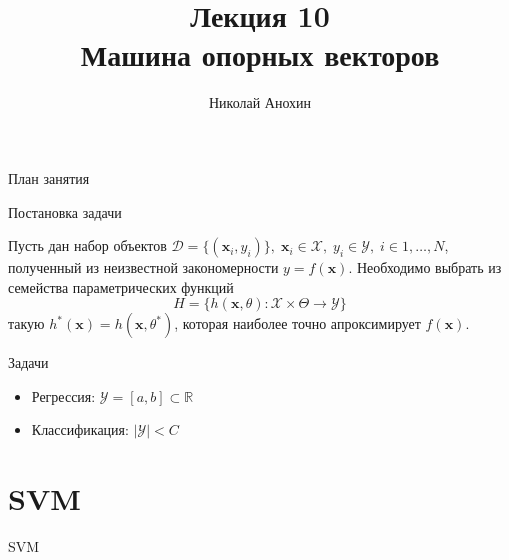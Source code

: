 \documentclass[10pt]{beamer}
\author{Николай Анохин}
\title{\newline \newline \newline Лекция 10 \\ Машина опорных векторов}
\let\otp\titlepage
\renewcommand{\titlepage}{\otp\addtocounter{framenumber}{-1}}
\begin{document}
\begin{frame}[plain]
\titlepage
\end{frame}

\begin{frame}{План занятия}
\tableofcontents
\end{frame}

\begin{frame}{Постановка задачи}

Пусть дан набор объектов $\mathcal{D} = \{(\mathbf{x}_i, y_i)\},
\; \mathbf{x}_i \in \mathcal{X},
\; y_i \in \mathcal{Y},
\; i \in 1, \ldots, N$, полученный из неизвестной закономерности $y = f(\mathbf{x})$. Необходимо выбрать из семейства параметрических функций
\[
H = \{h(\mathbf{x}, \theta): \mathcal{X} \times \Theta \rightarrow \mathcal{Y} \}
\]
такую $h^*(\mathbf{x}) = h(\mathbf{x}, \theta^*)$, которая наиболее точно апроксимирует $f(\mathbf{x})$.

\vspace{1em}
Задачи
\begin{itemize}
\item Регрессия: $\mathcal{Y} = [a, b] \subset \mathbb{R}$
\item Классификация: $|\mathcal{Y}| < C$
\end{itemize}

\end{frame}


\section{SVM}


\begin{frame}{}

\begin{center}
\Large SVM
\end{center}

\end{frame}
\end{document}
